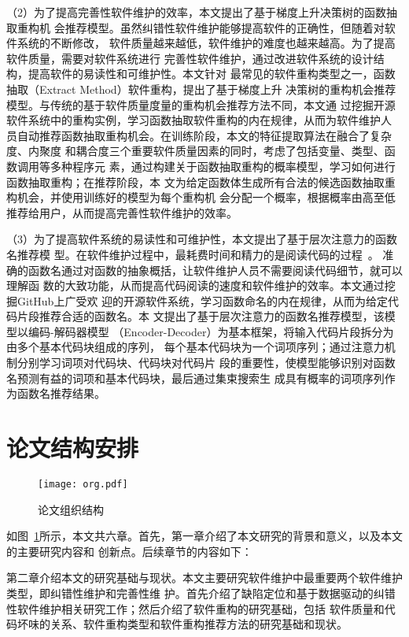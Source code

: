（2）为了提高完善性软件维护的效率，本文提出了基于梯度上升决策树的函数抽取重构机
会推荐模型。虽然纠错性软件维护能够提高软件的正确性，但随着对软件系统的不断修改，
软件质量越来越低，软件维护的难度也越来越高。为了提高软件质量，需要对软件系统进行
完善性软件维护，通过改进软件系统的设计结构，提高软件的易读性和可维护性。本文针对
最常见的软件重构类型之一，函数抽取（Extract Method）软件重构，提出了基于梯度上升
决策树的重构机会推荐模型。与传统的基于软件质量度量的重构机会推荐方法不同，本文通
过挖掘开源软件系统中的重构实例，学习函数抽取软件重构的内在规律，从而为软件维护人
员自动推荐函数抽取重构机会。在训练阶段，本文的特征提取算法在融合了复杂度、内聚度
和耦合度三个重要软件质量因素的同时，考虑了包括变量、类型、函数调用等多种程序元
素，通过构建关于函数抽取重构的概率模型，学习如何进行函数抽取重构；在推荐阶段，本
文为给定函数体生成所有合法的候选函数抽取重构机会，并使用训练好的模型为每个重构机
会分配一个概率，根据概率由高至低推荐给用户，从而提高完善性软件维护的效率。

（3）为了提高软件系统的易读性和可维护性，本文提出了基于层次注意力的函数名推荐模
型。在软件维护过程中，最耗费时间和精力的是阅读代码的过程~\cite{rugaber2000use}。
准确的函数名通过对函数的抽象概括，让软件维护人员不需要阅读代码细节，就可以理解函
数的大致功能，从而提高代码阅读的速度和软件维护的效率。本文通过挖掘GitHub上广受欢
迎的开源软件系统，学习函数命名的内在规律，从而为给定代码片段推荐合适的函数名。本
文提出了基于层次注意力的函数名推荐模型，该模型以编码-解码器模型
（Encoder-Decoder）为基本框架，将输入代码片段拆分为由多个基本代码块组成的序列，
每个基本代码块为一个词项序列；通过注意力机制分别学习词项对代码块、代码块对代码片
段的重要性，使模型能够识别对函数名预测有益的词项和基本代码块，最后通过集束搜索生
成具有概率的词项序列作为函数名推荐结果。

\section{论文结构安排}
\begin{figure}[htp]
  \centering
  \texttt{[image: org.pdf]}
  \caption{论文组织结构}
  \label{fig:org}
\end{figure}

如图~\ref{fig:org}所示，本文共六章。首先，第一章介绍了本文研究的背景和意义，以及本文的主要研究内容和
创新点。后续章节的内容如下：  

第二章介绍本文的研究基础与现状。本文主要研究软件维护中最重要两个软件维护类型，即纠错性维护和完善性维
护。首先介绍了缺陷定位和基于数据驱动的纠错性软件维护相关研究工作；然后介绍了软件重构的研究基础，包括
软件质量和代码坏味的关系、软件重构类型和软件重构推荐方法的研究基础和现状。

